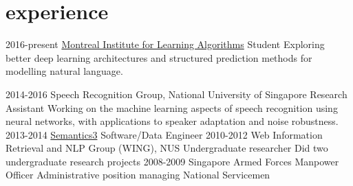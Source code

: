 \documentclass[]{friggeri-cv}
\begin{document}
\section{experience}

\begin{entrylist}
	\entry
	{2016-present}
	{\href{https://mila.quebec}{Montreal Institute for Learning Algorithms}}
	{Student}
	{Exploring better deep learning architectures and structured prediction 
	methods for modelling natural language.}

	\entry
	{2014-2016}
	{Speech Recognition Group, National University of Singapore}
	{Research Assistant}
	{Working on the machine learning aspects of speech recognition using neural 
	networks, with applications to speaker adaptation and noise robustness.}
	\entry
	{2013-2014}
	{\href{http://semantics3.com}{Semantics3}}
	{Software/Data Engineer}
	{
	\iftoggle{short}{Data scientist / Machine learning engineer related tasks 
	for processing data.}%
	{
		\begin{itemize}[itemsep=0pt,topsep=0pt]
			\item Classification of products into a hierarchical taxonomy using 
				a cascading naive bayes model built using the Lucene index.
			\item Name equivalency model used as part of the disambiguation 
				process to determine if two product names are referring to the 
				same thing.
			\item Experimented with using conditional random fields for 
				attribute extraction from product names.
		\end{itemize}
	}
	}
	\entry
	{2010-2012}
	{Web Information Retrieval and NLP Group (WING), NUS}
	{Undergraduate researcher}
	{Did two undergraduate research projects}
	\entry
	{2008-2009}
	{Singapore Armed Forces}
	{Manpower Officer}
	{Administrative position managing National Servicemen}
\iftoggle{short}{}%
{
	\entry
	{01-06 2007}
	{\href{http://www.np.edu.sg/ict/facilities/rhymes/Pages/loc\_rhymes.aspx}{RHyMeS 
	Center, Ngee Ann Polytechnic}}
	{Research/Teaching Assistant}
	{
		\begin{itemize}[itemsep=0pt,topsep=0pt]
			\item Provided technical support for students working on the RHyMeS 
				project.
			\item Facilitated workshops on using the RHyMeS SDK and API.
			\item  Taught students working on their projects how to use the Java 
				Swing UI API
		\end{itemize}
	}
}
\end{entrylist}
\end{document}
